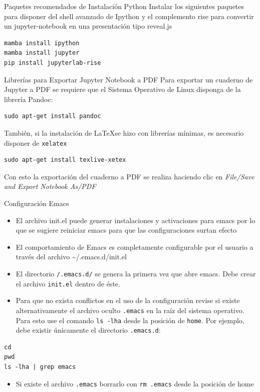 \documentclass[presentation]{beamer}
\begin{document}
\begin{frame}[label={sec:org3b6ff89},fragile]{Paquetes recomendados de Instalación Python}
 Instalar los siguientes paquetes para disponer del shell avanzado
de Ipython y el complemento \alert{rise} para convertir un jupyter-notebook
en una presentación tipo reveal.js

\begin{verbatim}
mamba install ipython
mamba install jupyter
pip install jupyterlab-rise
\end{verbatim}
\end{frame}
\begin{frame}[label={sec:org0bfbf0d},fragile]{Librerías para Exportar Jupyter Notebook a PDF}
 Para exportar un cuaderno de Jupyter a PDF se requiere que el Sistema
Operativo de Linux disponga de la librería Pandoc:
\begin{verbatim}
sudo apt-get install pandoc
\end{verbatim}
También, si la instalación de \LaTeX se hizo con librerías mínimas, es
necesario disponer de \texttt{xelatex}
\begin{verbatim}
sudo apt-get install texlive-xetex
\end{verbatim}

Con esto la exportación del cuaderno a PDF se realiza haciendo clic en
\alert{\emph{File/Save and Export Notebook As/PDF}}
\end{frame}
\begin{frame}{Configuración Emacs}
 \label{org454b557}

\begin{itemize}
\item El archivo init.el puede generar instalaciones y activaciones para
emacs por lo que se sugiere reiniciar emacs para que las
configuraciones surtan efecto
\item El comportamiento de Emacs es completamente configurable por el
usuario a través del archivo \textasciitilde{}/.emacs.d/init.el
\item El directorio \texttt{/.emacs.d/} se genera la primera vez que abre
emacs. Debe crear el archivo \texttt{init.el} dentro de éste.
\item Para que no exista conflictos en el uso de la configuración revise
si existe alternativamente el archivo oculto \texttt{.emacs} en la raíz del
sistema operativo. Para esto use el comando \texttt{ls -lha} desde la
posición de \texttt{home}. Por ejemplo, debe existir únicamente el
directorio \texttt{.emacs.d}:
\end{itemize}

\begin{verbatim}
cd
pwd
ls -lha | grep emacs
\end{verbatim}

\begin{itemize}
\item Si existe el archivo \texttt{.emacs} borrarlo con \texttt{rm .emacs} desde la
posición de  home
\end{itemize}
\end{frame}
\end{document}
